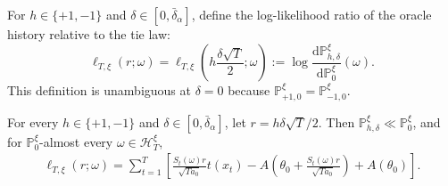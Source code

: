 \documentclass[10pt]{article}
\newcommand{\dd}{\mathrm{d}}
\theoremstyle{plain}
\begin{document}
For $h\in\{+1,-1\}$ and
$\delta\in[0,\bar\delta_\alpha]$, define the log-likelihood ratio of the oracle history relative to the tie law:
\begin{equation} \label{def_loglikelihood}
    \ell_{T,\xi}
    \left(
        r; \omega
    \right)=
    \ell_{T,\xi}
    \left(
        h\frac{\delta\sqrt T}{2};
        \omega
    \right)
    :=
    \log
    \frac{
        \dd\mathbb P_{h,\delta}^{\xi}
    }{
        \dd\mathbb P_0^\xi
    }(\omega).
\end{equation}
This definition is unambiguous at $\delta=0$ because
$\mathbb P_{+1,0}^{\xi}=\mathbb P_{-1,0}^{\xi}$.

\begin{lemma}
\label{lem:local-likelihood-sufficient-transfer-lower}
For every $h\in\{+1,-1\}$ and
$\delta\in[0,\bar\delta_\alpha]$, let
$r=h\delta\sqrt T/2$. Then
$\mathbb P_{h,\delta}^{\xi}\ll\mathbb P_0^\xi$, and for
$\mathbb P_0^\xi$-almost every
$\omega\in\mathcal H_T^\xi$,
\begin{equation}
\label{eq:exact-local-likelihood-transfer-lower}
\begin{aligned}
    \ell_{T,\xi}(r;\omega)
    =
    \sum_{t=1}^T
    \left[
        \frac{S_t(\omega)r}{\sqrt{Ta_0}}t(x_t)
        -
        A\left(
            \theta_0+
            \frac{S_t(\omega)r}{\sqrt{Ta_0}}
        \right)
        +
        A(\theta_0)
    \right].
\end{aligned}
\end{equation}
\end{lemma}
\end{document}
